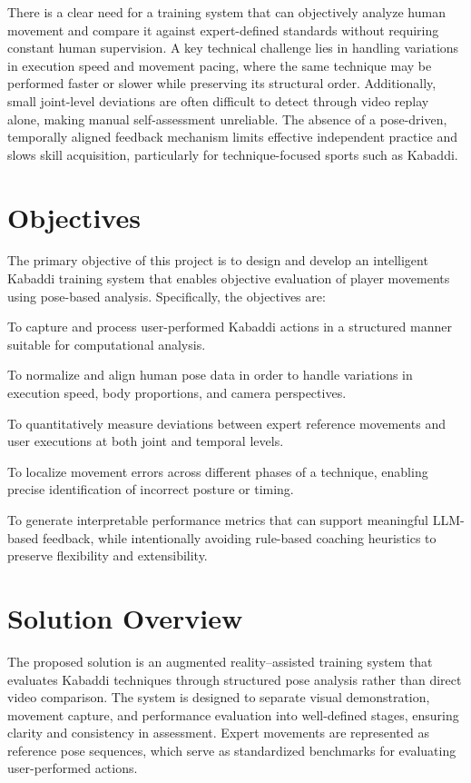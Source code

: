 \documentclass[12pt, a4paper]{report}
\begin{document}
There is a clear need for a training system that can objectively analyze human movement and compare it against expert-defined standards without requiring constant human supervision. A key technical challenge lies in handling variations in execution speed and movement pacing, where the same technique may be performed faster or slower while preserving its structural order. Additionally, small joint-level deviations are often difficult to detect through video replay alone, making manual self-assessment unreliable. The absence of a pose-driven, temporally aligned feedback mechanism limits effective independent practice and slows skill acquisition, particularly for technique-focused sports such as Kabaddi.


\section{Objectives}
The primary objective of this project is to design and develop an intelligent Kabaddi training system that enables objective evaluation of player movements using pose-based analysis. Specifically, the objectives are:

To capture and process user-performed Kabaddi actions in a structured manner suitable for computational analysis.

To normalize and align human pose data in order to handle variations in execution speed, body proportions, and camera perspectives.

To quantitatively measure deviations between expert reference movements and user executions at both joint and temporal levels.

To localize movement errors across different phases of a technique, enabling precise identification of incorrect posture or timing.

To generate interpretable performance metrics that can support meaningful LLM-based feedback, while intentionally avoiding rule-based coaching heuristics to preserve flexibility and extensibility.


\section{Solution Overview}
The proposed solution is an augmented reality–assisted training system that evaluates Kabaddi techniques through structured pose analysis rather than direct video comparison. The system is designed to separate visual demonstration, movement capture, and performance evaluation into well-defined stages, ensuring clarity and consistency in assessment. Expert movements are represented as reference pose sequences, which serve as standardized benchmarks for evaluating user-performed actions.
\end{document}
